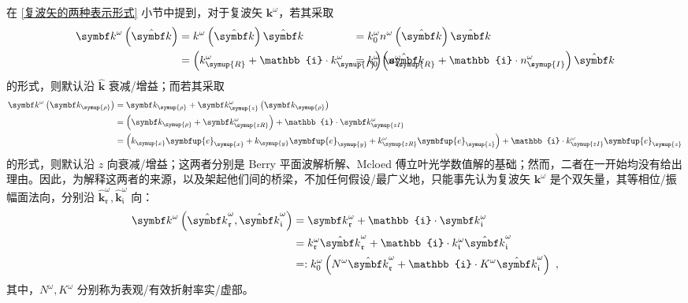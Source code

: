 在 \ref{复波矢的两种表示形式} 小节中提到，对于复波矢 ${\symbf k}^\omega$，若其采取
\begin{subequations} \label{eq:2-85}
\abovedisplayskip=10pt
\belowdisplayskip=10pt
\begin{align}
	{\symbf k}^\omega \left( \hat{\symbf k} \right) &= k^\omega \left( \hat{\symbf k} \right) \hat{\symbf k} \hspace{-7.5em}&&= k^\omega_{0} n^\omega \left( \hat{\symbf k} \right) \hat{\symbf k} \label{eq:2-85a} \\ &= \left( k^\omega_{\symup{R}} + \mathbb{i} \cdot k^\omega_{\symup{I}} \right) \hat{\symbf k} \hspace{-7.5em}&&= k^\omega_{0} \left( n^\omega_{\symup{R}} + \mathbb{i} \cdot n^\omega_{\symup{I}} \right) \hat{\symbf k} \label{eq:2-85b}
\end{align}
\end{subequations}
的形式，则默认沿 $\hat{\symbf k}$ 衰减/增益；而若其采取
\begin{subequations} \label{eq:2-86}
\abovedisplayskip=10pt
\belowdisplayskip=10pt
\begin{align}
	{\symbf k}^\omega \left( \symbf k_{\symup{\rho}} \right) &= \symbf k_{\symup{\rho}} + \symbf k^\omega_{\symup{z}} \left( \symbf k_{\symup{\rho}} \right) \label{eq:2-86a}\\ &= \left( \symbf k_{\symup{\rho}} + \symbf k^\omega_{\symup{zR}} \right) + \mathbb{i} \cdot \symbf k^\omega_{\symup{zI}} \label{eq:2-86b}\\ &= \left( k_{\symup{x}} \symbfup{e}_{\symup{x}} + k_{\symup{y}} \symbfup{e}_{\symup{y}} + k^\omega_{\symup{zR}} \symbfup{e}_{\symup{z}} \right) + \mathbb{i} \cdot k^\omega_{\symup{zI}} \symbfup{e}_{\symup{z}} \label{eq:2-86c}
\end{align}
\end{subequations}
的形式，则默认沿 $z$ 向衰减/增益；这两者分别是 Berry 平面波解析解、Mcloed 傅立叶光学数值解的基础；然而，二者在一开始均没有给出理由。因此，为解释这两者的来源，以及架起他们间的桥梁，不加任何假设/最广义地，只能事先认为复波矢 ${\symbf k}^\omega$ 是个双矢量，其等相位/振幅面法向，分别沿 $\hat{\symbf k}_{\mathfrak{r}}^\omega, \hat{\symbf k}_{\mathfrak{i}}^\omega$ 向：
\begin{subequations} \label{eq:2-87}
\abovedisplayskip=10pt
\belowdisplayskip=10pt
\begin{align}
	{\symbf k}^\omega \left( \hat{\symbf k}_{\mathfrak{r}}^\omega, \hat{\symbf k}_{\mathfrak{i}}^\omega \right) &= {\symbf k}^\omega_{\mathfrak{r}} + \mathbb{i} \cdot {\symbf k}^\omega_{\mathfrak{i}} \label{eq:2-87a}\\&= k^\omega_{\mathfrak{r}} \hat{\symbf k}_{\mathfrak{r}}^\omega + \mathbb{i} \cdot k^\omega_{\mathfrak{i}} \hat{\symbf k}_{\mathfrak{i}}^\omega \label{eq:2-87b}\\&=: k^\omega_{0} \left( N^\omega \hat{\symbf k}_{\mathfrak{r}}^\omega + \mathbb{i} \cdot K^\omega \hat{\symbf k}_{\mathfrak{i}}^\omega \right) ~, \label{eq:2-87c}
\end{align}
\end{subequations}
其中，$N^\omega, K^\omega$ 分别称为表观/有效折射率实/虚部。

